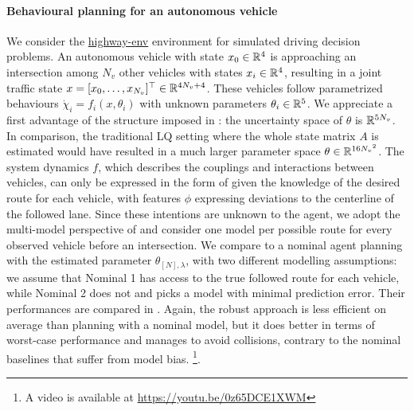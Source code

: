 \paragraph{Behavioural planning for an autonomous vehicle}
We consider the \href{https://github.com/eleurent/highway-env}{highway-env} environment \citep{highway-env} for simulated driving decision problems. An autonomous vehicle with state $x_0\in\mathbb{R}^4$ is approaching an intersection among ${N_v}$ other vehicles with states $x_i\in\mathbb{R}^4$, resulting in a joint traffic state $x = [x_0, \dots,x_{N_v}]^\top\in\mathbb{R}^{4{N_v}+4}$. These vehicles follow parametrized behaviours $\dot{\chi}_i=f_i(x,\theta_i)$ with unknown parameters $\theta_i\in\mathbb{R}^5$. We appreciate a first advantage of the structure imposed in : the uncertainty space of $\theta$ is $\mathbb{R}^{5{N_v}}$. In comparison, the traditional LQ setting where the whole state matrix $A$ is estimated would have resulted in a much larger parameter space $\theta\in\mathbb{R}^{16{N_v}^2}$.
The system dynamics $f$, which describes the couplings and interactions between vehicles, can only be expressed in the form of  given the knowledge of the desired route for each vehicle, with features $\phi$ expressing deviations to the centerline of the followed lane. Since these intentions are unknown to the agent, we adopt the multi-model perspective of  and consider one model per possible route for every observed vehicle before an intersection. We compare  to a nominal agent planning with the estimated parameter $\theta_{[N],\lambda}$, with two different modelling assumptions: we assume that Nominal 1 has access to the true followed route for each vehicle, while Nominal 2 does not and picks a model with minimal prediction error. Their performances are compared in . Again, the robust approach is less efficient on average than planning with a nominal model, but it does better in terms of worst-case performance and manages to avoid collisions, contrary to the nominal baselines that suffer from model bias. \footnote{A video is available at \href{https://youtu.be/0z65DCE1XWM}{https://youtu.be/0z65DCE1XWM}}.

